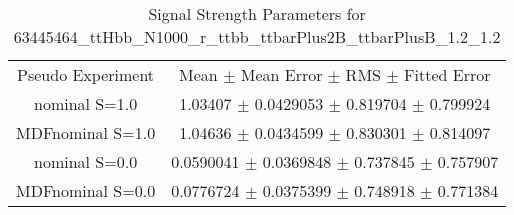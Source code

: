 \begin{table}
\centering
\caption{Signal Strength Parameters for 63445464\_ttHbb\_N1000\_r\_ttbb\_ttbarPlus2B\_ttbarPlusB\_1.2\_1.2}
\begin{tabular}{cc}
\toprule
Pseudo Experiment & Mean $\pm$ Mean Error $\pm$ RMS $\pm$ Fitted Error\\
nominal S=1.0 & \num{1.03407} $\pm$ \num{0.0429053} $\pm$ \num{0.819704} $\pm$ \num{0.799924}\\
MDFnominal S=1.0 & \num{1.04636} $\pm$ \num{0.0434599} $\pm$ \num{0.830301} $\pm$ \num{0.814097}\\
nominal S=0.0 & \num{0.0590041} $\pm$ \num{0.0369848} $\pm$ \num{0.737845} $\pm$ \num{0.757907}\\
MDFnominal S=0.0 & \num{0.0776724} $\pm$ \num{0.0375399} $\pm$ \num{0.748918} $\pm$ \num{0.771384}\\
\bottomrule
\end{tabular}
\end{table}